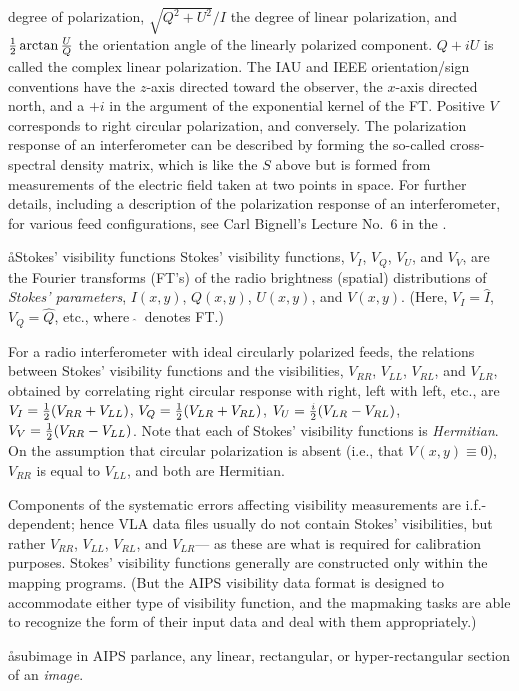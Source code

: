 degree of polarization,
$\sqrt{Q^2+U^2}/I$ the degree of linear polarization,
and ${1\over2}\arctan{U\over Q}$ the orientation angle
of the linearly polarized component.
$Q+iU$ is called the complex linear polarization.
The IAU and IEEE orientation/sign conventions have the $z$-axis
directed toward the observer, the $x$-axis directed north,
and a $+i$ in the argument of the exponential kernel of the FT.
Positive $V$ corresponds to right circular polarization, and conversely.
The polarization response of an interferometer can be described
by forming the so-called cross-spectral density matrix, which is like
the $S$ above but is formed from measurements of the electric field
taken at two points in space.
For further details, including a description
of the polarization response of an interferometer,
for various feed configurations, see Carl Bignell's
Lecture No.~6 in the \wsp.

\aa{Stokes' visibility functions}
Stokes' visibility functions, $V_I$, $V_Q$, $V_U$, and $V_V$,
are the Fourier transforms (FT's) of the radio brightness (spatial)
distributions of {\it Stokes' parameters},
$I(x,y)$, $Q(x,y)$, $U(x,y)$, and $V(x,y)$.
(Here, $V_I=\hat I$, $V_Q=\hat Q$, etc., where $\ \hat {}\ $ denotes FT.)
\par
For a radio interferometer with ideal circularly polarized feeds,
the relations between Stokes' visibility functions
and the visibilities, $V_{RR}$, $V_{LL}$, $V_{RL}$, and $V_{LR}$,
obtained by correlating right circular response with right,
left with left, etc., are
$V_I={1\over2}(V_{RR}+V_{LL})$, $V_Q={1\over2}(V_{LR}+V_{RL})$,
$V_U={i\over2}(V_{LR}-V_{RL})$, $V_V={1\over2}(V_{RR}-V_{LL})$.
Note that each of Stokes' visibility functions is {\it Hermitian}.
On the assumption that circular polarization is absent
(i.e., that $V(x,y)\equiv0$), $V_{RR}$ is equal to $V_{LL}$,
and both are Hermitian.
\par
Components of the systematic errors affecting visibility
measurements are i.f.-dependent;
hence VLA \uv data files usually do not contain Stokes'
visibilities, but rather $V_{RR}$, $V_{LL}$, $V_{RL}$, and $V_{LR}$---%
as these are what is required for calibration purposes.
Stokes' visibility functions generally are constructed only within
the mapping programs.
(But the AIPS visibility data format is designed to accommodate
either type of visibility function, and the mapmaking tasks are
able to recognize the form of their input data and deal with them
appropriately.)

\aa{subimage}
in AIPS parlance, any linear, rectangular, or hyper-rectangular
section of an {\it image}.

